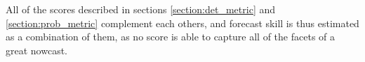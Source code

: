 
 All of the scores described in sections \ref{section:det_metric} and \ref{section:prob_metric} complement each others, and forecast skill is thus estimated as a combination of them, as no score is able to capture all of the facets of a great nowcast. 
 

